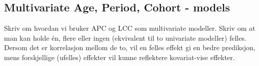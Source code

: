 \subsection{Multivariate Age, Period, Cohort - models}
\label{sec:multivariateAPC}
\textcolor{myDarkGreen}{
Skriv om hvordan vi bruker APC og LCC som multivariate modeller. Skriv om at man kan holde én, flere eller ingen (ekvivalent til to univariate modeller) felles. Dersom det er korrelasjon mellom de to, vil en felles effekt gi en bedre prediksjon, mens forskjellige (ufelles) effekter vil kunne reflektere kovariat-vise effekter. 
}